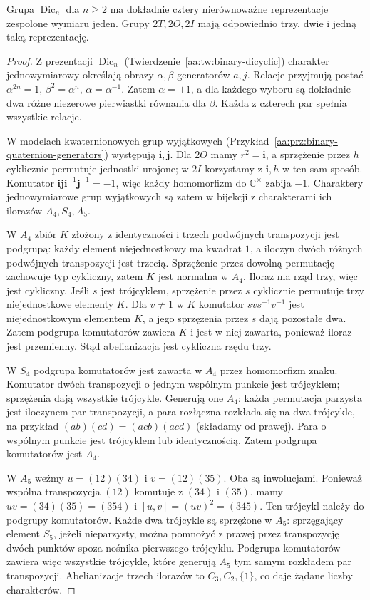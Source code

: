 \begin{lemat}
\label{aa:lem:mckay-abelianizations}
Grupa $\operatorname{Dic}_n$ dla $n\ge2$ ma dokładnie
cztery nierównoważne reprezentacje zespolone wymiaru jeden.
Grupy $2T,2O,2I$ mają odpowiednio trzy, dwie i jedną
taką reprezentację.
\end{lemat}
\begin{proof}
Z prezentacji $\operatorname{Dic}_n$
(Twierdzenie~\ref{aa:tw:binary-dicyclic}) charakter
jednowymiarowy określają obrazy $\alpha,\beta$ generatorów
$a,j$. Relacje przyjmują postać
$\alpha^{2n}=1$, $\beta^2=\alpha^n$, $\alpha=\alpha^{-1}$.
Zatem $\alpha=\pm1$, a dla każdego wyboru są dokładnie
dwa różne niezerowe pierwiastki równania dla $\beta$.
Każda z czterech par spełnia wszystkie relacje.

W modelach kwaternionowych grup wyjątkowych
(Przykład~\ref{aa:prz:binary-quaternion-generators})
występują $\mathbf i,\mathbf j$. Dla $2O$ mamy
$r^2=\mathbf i$, a sprzężenie przez $h$ cyklicznie
permutuje jednostki urojone; w $2I$ korzystamy
z $\mathbf i,h$ w ten sam sposób.
Komutator $\mathbf i\mathbf j\mathbf i^{-1}\mathbf j^{-1}=-1$,
więc każdy homomorfizm do $\mathbb C^\times$ zabija $-1$.
Charaktery jednowymiarowe grup wyjątkowych są zatem
w bijekcji z charakterami ich ilorazów $A_4,S_4,A_5$.

W $A_4$ zbiór $K$ złożony z identyczności i trzech
podwójnych transpozycji jest podgrupą: każdy element
niejednostkowy ma kwadrat $1$, a iloczyn dwóch różnych
podwójnych transpozycji jest trzecią.
Sprzężenie przez dowolną permutację zachowuje typ
cykliczny, zatem $K$ jest normalna w $A_4$.
Iloraz ma rząd trzy, więc jest cykliczny. Jeśli $s$ jest trójcyklem, sprzężenie
przez $s$ cyklicznie permutuje trzy niejednostkowe
elementy $K$. Dla $v\ne1$ w $K$ komutator
$svs^{-1}v^{-1}$ jest niejednostkowym elementem $K$,
a jego sprzężenia przez $s$ dają pozostałe dwa.
Zatem podgrupa komutatorów zawiera $K$ i jest w niej
zawarta, ponieważ iloraz jest przemienny.
Stąd abelianizacja jest cykliczna rzędu trzy.

W $S_4$ podgrupa komutatorów jest zawarta w $A_4$
przez homomorfizm znaku. Komutator dwóch transpozycji
o jednym wspólnym punkcie jest trójcyklem; sprzężenia
dają wszystkie trójcykle. Generują one $A_4$:
każda permutacja parzysta jest iloczynem par transpozycji,
a para rozłączna rozkłada się na dwa trójcykle,
na przykład $(ab)(cd)=(acb)(acd)$ (składamy od prawej).
Para o wspólnym punkcie jest trójcyklem lub identycznością.
Zatem podgrupa komutatorów jest $A_4$.

W $A_5$ weźmy $u=(12)(34)$ i $v=(12)(35)$.
Oba są inwolucjami. Ponieważ wspólna transpozycja
$(12)$ komutuje z $(34)$ i $(35)$, mamy
$uv=(34)(35)=(354)$ i $[u,v]=(uv)^2=(345)$.
Ten trójcykl należy do podgrupy komutatorów.
Każde dwa trójcykle są sprzężone w $A_5$:
sprzęgający element $S_5$, jeżeli nieparzysty,
można pomnożyć z prawej przez transpozycję dwóch
punktów spoza nośnika pierwszego trójcyklu.
Podgrupa komutatorów zawiera więc wszystkie trójcykle,
które generują $A_5$ tym samym rozkładem par transpozycji.
Abelianizacje trzech ilorazów to $C_3,C_2,\{1\}$,
co daje żądane liczby charakterów.
\end{proof}

